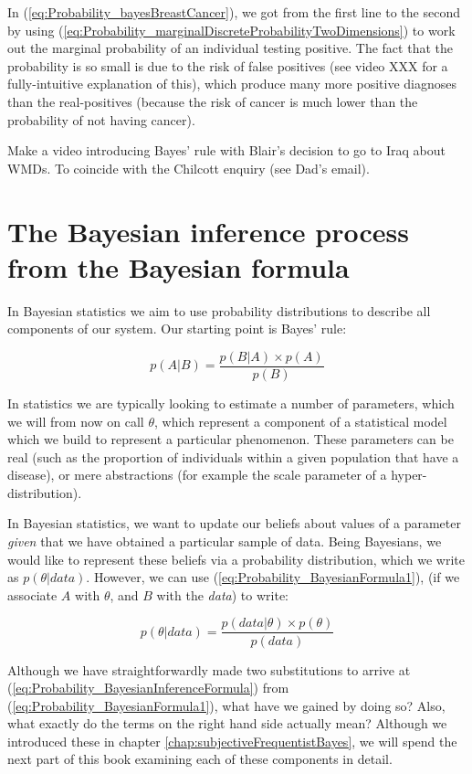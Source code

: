 \documentclass[11pt,fullpage]{book}
\begin{document}
In (\ref{eq:Probability_bayesBreastCancer}), we got from the first line to the second by using (\ref{eq:Probability_marginalDiscreteProbabilityTwoDimensions}) to work out the marginal probability of an individual testing positive. The fact that the probability is so small is due to the risk of false positives (see video XXX for a fully-intuitive explanation of this), which produce many more positive diagnoses than the real-positives (because the risk of cancer is much lower than the probability of not having cancer).

 Make a video introducing Bayes' rule with Blair's decision to go to Iraq about WMDs. To coincide with the Chilcott enquiry (see Dad's email).

\section{The Bayesian inference process from the Bayesian formula}
In Bayesian statistics we aim to use probability distributions to describe all components of our system. Our starting point is Bayes' rule:

\begin{equation}\label{eq:Probability_BayesianFormula1}
p(A|B) = \frac{p(B|A)\times p(A)}{p(B)}
\end{equation}

In statistics we are typically looking to estimate a number of parameters, which we will from now on call $\theta$, which represent a component of a statistical model which we build to represent a particular phenomenon. These parameters can be real (such as the proportion of individuals within a given population that have a disease), or mere abstractions (for example the scale parameter of a hyper-distribution).

In Bayesian statistics, we want to update our beliefs about values of a parameter \textit{given} that we have obtained a particular sample of data. Being Bayesians, we would like to represent these beliefs via a probability distribution, which we write as $p(\theta|data)$. However, we can use (\ref{eq:Probability_BayesianFormula1}), (if we associate $A$ with $\theta$, and $B$ with the \textit{data}) to write:

\begin{equation}\label{eq:Probability_BayesianInferenceFormula}
p(\theta|data) = \frac{p(data|\theta)\times p(\theta)}{p(data)}
\end{equation}

Although we have straightforwardly made two substitutions to arrive at (\ref{eq:Probability_BayesianInferenceFormula}) from (\ref{eq:Probability_BayesianFormula1}), what have we gained by doing so? Also, what exactly do the terms on the right hand side actually mean? Although we introduced these in chapter \ref{chap:subjectiveFrequentistBayes}, we will spend the next part of this book examining each of these components in detail.
\end{document}
